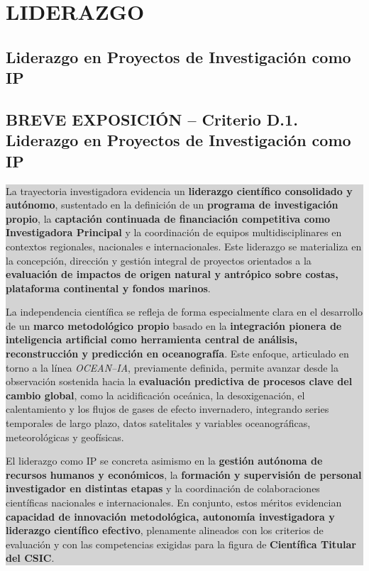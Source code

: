 \documentclass[11pt,a4paper]{article}
\newcommand{\breveexposicion}[2]{
    \subsection*{\color{darkgray}\textbf{BREVE EXPOSICIÓN -- #1}}
    \vspace{0.3em}
    \noindent\colorbox{lightgray}{%
        \begin{minipage}{0.97\textwidth}
        \vspace{0.5em}
        \color{darkgray}
        #2
        \vspace{0.5em}
        \end{minipage}
    }
    \vspace{1em}
}
\begin{document}

\section{LIDERAZGO}


\subsection{Liderazgo en Proyectos de Investigación como IP}

\breveexposicion{Criterio D.1. Liderazgo en Proyectos de Investigación como IP}{
La trayectoria investigadora evidencia un \textbf{liderazgo científico consolidado y autónomo}, sustentado en la definición de un \textbf{programa de investigación propio}, la \textbf{captación continuada de financiación competitiva como Investigadora Principal} y la coordinación de equipos multidisciplinares en contextos regionales, nacionales e internacionales. Este liderazgo se materializa en la concepción, dirección y gestión integral de proyectos orientados a la \textbf{evaluación de impactos de origen natural y antrópico sobre costas, plataforma continental y fondos marinos}.

La independencia científica se refleja de forma especialmente clara en el desarrollo de un \textbf{marco metodológico propio} basado en la \textbf{integración pionera de inteligencia artificial como herramienta central de análisis, reconstrucción y predicción en oceanografía}. Este enfoque, articulado en torno a la línea \textit{OCEAN--IA}, previamente definida, permite avanzar desde la observación sostenida hacia la \textbf{evaluación predictiva de procesos clave del cambio global}, como la acidificación oceánica, la desoxigenación, el calentamiento y los flujos de gases de efecto invernadero, integrando series temporales de largo plazo, datos satelitales y variables oceanográficas, meteorológicas y geofísicas.

El liderazgo como IP se concreta asimismo en la \textbf{gestión autónoma de recursos humanos y económicos}, la \textbf{formación y supervisión de personal investigador en distintas etapas} y la coordinación de colaboraciones científicas nacionales e internacionales. En conjunto, estos méritos evidencian \textbf{capacidad de innovación metodológica, autonomía investigadora y liderazgo científico efectivo}, plenamente alineados con los criterios de evaluación y con las competencias exigidas para la figura de \textbf{Científica Titular del CSIC}.
}
\end{document}
